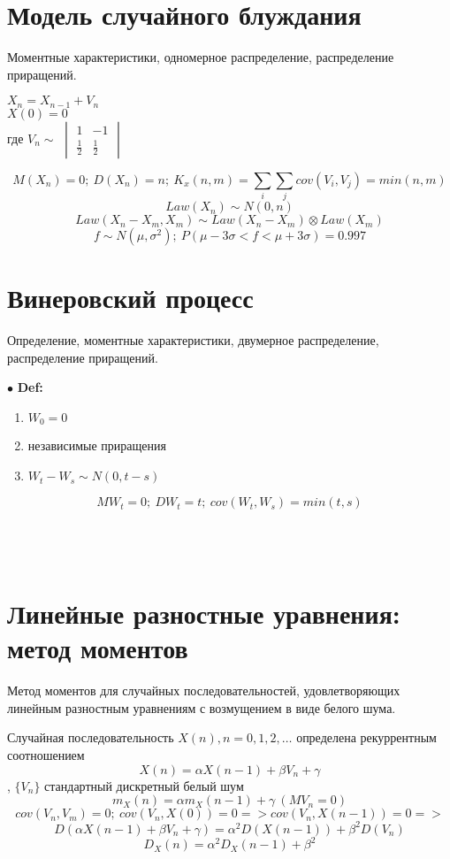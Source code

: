 \documentclass[11pt]{article}
\begin{document}
\section{Модель случайного блуждания}
\begin{center} Моментные характеристики, одномерное распределение, распределение приращений. \end{center}
	$X_n = X_{n-1} + V_n$\\
	$X(0) = 0$ \\
где 
$V_n 
\sim $
$\begin{vmatrix}
1 & -1 \\
\frac{1}{2} & \frac{1}{2}
\end{vmatrix}$

$$M(X_n) = 0; \ D(X_n) = n; \ K_x(n,m) = \sum_{i}\sum_{j} cov(V_i,V_j) = min(n,m)$$
$$Law(X_n) \sim N(0,n)$$
$$Law(X_n - X_m, X_m) \sim Law(X_n - X_m) \otimes Law(X_m)$$
$$f \sim N(\mu,\sigma^{2}); \ P(\mu - 3\sigma < f < \mu + 3\sigma) = 0.997$$

\section{Винеровский процесс}
\begin{center} Определение, моментные характеристики, двумерное распределение, распределение приращений. \end{center}
$\bullet$ \textbf{Def:} \\
\begin{enumerate}
	\item $W_0 = 0$
	\item независимые приращения
	\item $W_t - W_s \sim N(0, t-s)$
\end{enumerate}
$$MW_t = 0; \ DW_t = t; \ cov(W_t,W_s) = min(t,s)$$ \\ \\ \\

\section{Линейные разностные уравнения: метод моментов}
\begin{center} Метод моментов для случайных последовательностей, удовлетворяющих линейным разностным уравнениям с возмущением в виде белого шума.\end{center}
Случайная последовательность ${X(n), n = 0, 1, 2, \ldots}$ определена рекуррентным соотношением
$$X(n)= \alpha X(n−1)+ \beta V_n + \gamma$$, $\{V_n\}$ стандартный дискретный белый шум
$$m_X(n)= \alpha m_X(n−1)+ \gamma \ (M{V_n} = 0)$$
$$ cov(V_n, V_m) = 0;\ cov(V_n, X(0)) = 0 => cov(V_n, X(n − 1)) = 0 =>$$
$$ D(\alpha X(n − 1) + \beta V_n + \gamma) =  \alpha^2D(X(n − 1)) + \beta^2D(V_n) $$
$$D_X(n)= \alpha^2D_X(n−1)+\beta^2$$
\end{document}
